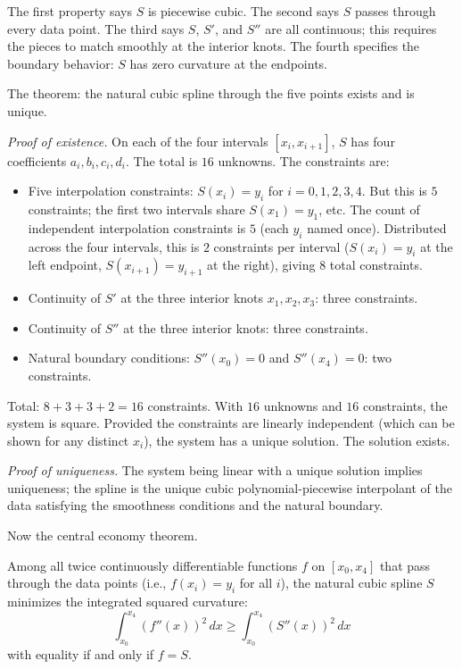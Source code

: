 The first property says $S$ is piecewise cubic. The second says $S$
passes through every data point. The third says $S$, $S'$, and $S''$
are all continuous; this requires the pieces to match smoothly at the
interior knots. The fourth specifies the boundary behavior:
$S$ has zero curvature at the endpoints.

The theorem: the natural cubic spline through the five points exists
and is unique.

\emph{Proof of existence.} On each of the four intervals $[x_i,
x_{i+1}]$, $S$ has four coefficients $a_i, b_i, c_i, d_i$. The total
is $16$ unknowns. The constraints are:
\begin{itemize}
\item Five interpolation constraints: $S(x_i) = y_i$ for $i = 0, 1,
2, 3, 4$. But this is $5$ constraints; the first two intervals
share $S(x_1) = y_1$, etc. The count of independent interpolation
constraints is $5$ (each $y_i$ named once). Distributed across the
four intervals, this is $2$ constraints per interval ($S(x_i) =
y_i$ at the left endpoint, $S(x_{i+1}) = y_{i+1}$ at the right),
giving $8$ total constraints.
\item Continuity of $S'$ at the three interior knots $x_1, x_2,
x_3$: three constraints.
\item Continuity of $S''$ at the three interior knots: three
constraints.
\item Natural boundary conditions: $S''(x_0) = 0$ and $S''(x_4)
= 0$: two constraints.
\end{itemize}
Total: $8 + 3 + 3 + 2 = 16$ constraints. With $16$ unknowns and $16$
constraints, the system is square. Provided the constraints are
linearly independent (which can be shown for any distinct
$x_i$), the system has a unique solution. The solution exists.

\emph{Proof of uniqueness.} The system being linear with a unique
solution implies uniqueness; the spline is the unique cubic
polynomial-piecewise interpolant of the data satisfying the
smoothness conditions and the natural boundary.

Now the central economy theorem.

\begin{theorem}
Among all twice continuously differentiable functions $f$ on $[x_0,
x_4]$ that pass through the data points (i.e., $f(x_i) = y_i$ for
all $i$), the natural cubic spline $S$ minimizes the integrated
squared curvature:
\[
\int_{x_0}^{x_4} (f''(x))^2 \, dx \ge \int_{x_0}^{x_4} (S''(x))^2 \, dx
\]
with equality if and only if $f = S$.
\end{theorem}

